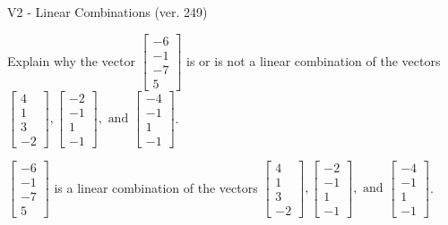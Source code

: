 \begin{exercise}
  \begin{exerciseTitle}V2 - Linear Combinations (ver. 249)\end{exerciseTitle}
  \begin{exerciseStatement}
    Explain why the vector \(\left[\begin{array}{c}
-6 \\
-1 \\
-7 \\
5
\end{array}\right]\)  is or is not a linear 
	combination of the vectors \(\left[\begin{array}{c}
4 \\
1 \\
3 \\
-2
\end{array}\right] , \left[\begin{array}{c}
-2 \\
-1 \\
1 \\
-1
\end{array}\right] , \text{ and } \left[\begin{array}{c}
-4 \\
-1 \\
1 \\
-1
\end{array}\right]\).
	


  \end{exerciseStatement}
  \begin{exerciseAnswer}
   \(\left[\begin{array}{c}
-6 \\
-1 \\
-7 \\
5
\end{array}\right]\) 
  	 is  
	a linear combination of the vectors \(\left[\begin{array}{c}
4 \\
1 \\
3 \\
-2
\end{array}\right] , \left[\begin{array}{c}
-2 \\
-1 \\
1 \\
-1
\end{array}\right] , \text{ and } \left[\begin{array}{c}
-4 \\
-1 \\
1 \\
-1
\end{array}\right]\).

	
  


  \end{exerciseAnswer}
\end{exercise}